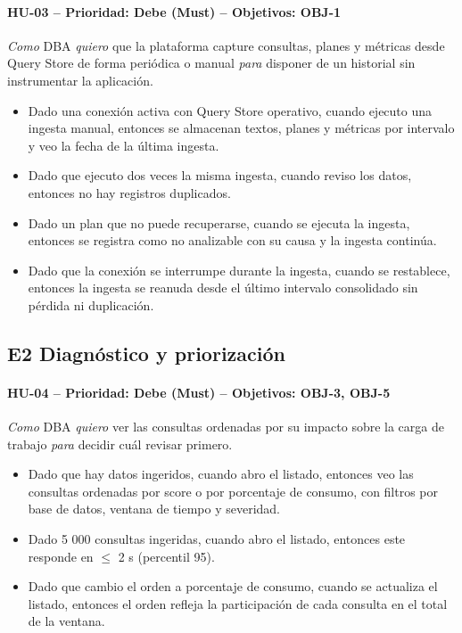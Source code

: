 \documentclass[11pt,a4paper]{report}
\begin{document}
\paragraph{HU-03 -- Prioridad: Debe (Must) -- Objetivos: OBJ-1}
\textit{Como} DBA \textit{quiero} que la plataforma capture consultas, planes y métricas desde Query Store de forma periódica o manual \textit{para} disponer de un historial sin instrumentar la aplicación.
\begin{itemize}[leftmargin=1.3em,itemsep=1pt]
\item[\textbf{CA-HU03.1}] Dado una conexión activa con Query Store operativo, cuando ejecuto una ingesta manual, entonces se almacenan textos, planes y métricas por intervalo y veo la fecha de la última ingesta.
\item[\textbf{CA-HU03.2}] Dado que ejecuto dos veces la misma ingesta, cuando reviso los datos, entonces no hay registros duplicados.
\item[\textbf{CA-HU03.3}] Dado un plan que no puede recuperarse, cuando se ejecuta la ingesta, entonces se registra como no analizable con su causa y la ingesta continúa.
\item[\textbf{CA-HU03.4}] Dado que la conexión se interrumpe durante la ingesta, cuando se restablece, entonces la ingesta se reanuda desde el último intervalo consolidado sin pérdida ni duplicación.
\end{itemize}

\subsection{E2 Diagnóstico y priorización}
\paragraph{HU-04 -- Prioridad: Debe (Must) -- Objetivos: OBJ-3, OBJ-5}
\textit{Como} DBA \textit{quiero} ver las consultas ordenadas por su impacto sobre la carga de trabajo \textit{para} decidir cuál revisar primero.
\begin{itemize}[leftmargin=1.3em,itemsep=1pt]
\item[\textbf{CA-HU04.1}] Dado que hay datos ingeridos, cuando abro el listado, entonces veo las consultas ordenadas por score o por porcentaje de consumo, con filtros por base de datos, ventana de tiempo y severidad.
\item[\textbf{CA-HU04.2}] Dado 5 000 consultas ingeridas, cuando abro el listado, entonces este responde en $\leq$ 2 s (percentil 95).
\item[\textbf{CA-HU04.3}] Dado que cambio el orden a porcentaje de consumo, cuando se actualiza el listado, entonces el orden refleja la participación de cada consulta en el total de la ventana.
\end{itemize}
\end{document}
